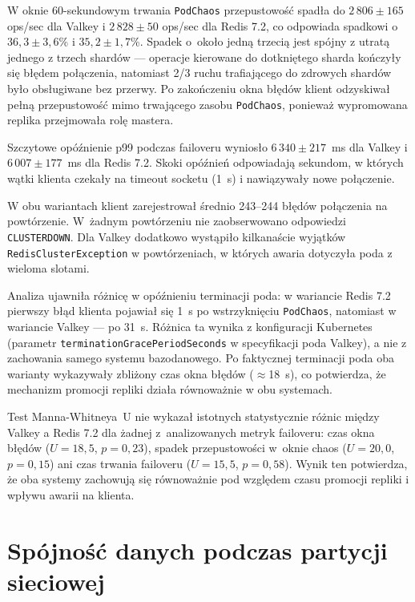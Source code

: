 W oknie 60-sekundowym trwania \texttt{PodChaos} przepustowość spadła do $2\,806 \pm 165$ ops/sec dla Valkey i $2\,828 \pm 50$ ops/sec dla Redis 7.2, co odpowiada spadkowi o $36{,}3 \pm 3{,}6$\% i $35{,}2 \pm 1{,}7$\%. Spadek o~około jedną trzecią jest spójny z utratą jednego z trzech shardów --- operacje kierowane do dotkniętego sharda kończyły się błędem połączenia, natomiast 2/3 ruchu trafiającego do zdrowych shardów było obsługiwane bez przerwy. Po zakończeniu okna błędów klient odzyskiwał pełną przepustowość mimo trwającego zasobu \texttt{PodChaos}, ponieważ wypromowana replika przejmowała rolę mastera.

Szczytowe opóźnienie p99 podczas failoveru wyniosło $6\,340 \pm 217$~ms dla Valkey i $6\,007 \pm 177$~ms dla Redis 7.2. Skoki opóźnień odpowiadają sekundom, w których wątki klienta czekały na timeout socketu (1~s) i nawiązywały nowe połączenie.

W obu wariantach klient zarejestrował średnio 243--244 błędów połączenia na powtórzenie. W~żadnym powtórzeniu nie zaobserwowano odpowiedzi \texttt{CLUSTERDOWN}. Dla Valkey dodatkowo wystąpiło kilkanaście wyjątków \texttt{RedisClusterException} w powtórzeniach, w których awaria dotyczyła poda z wieloma slotami.

Analiza ujawniła różnicę w opóźnieniu terminacji poda: w wariancie Redis 7.2 pierwszy błąd klienta pojawiał się 1~s po wstrzyknięciu \texttt{PodChaos}, natomiast w wariancie Valkey --- po 31~s. Różnica ta wynika z konfiguracji Kubernetes (parametr \texttt{terminationGracePeriodSeconds} w specyfikacji poda Valkey), a nie z zachowania samego systemu bazodanowego. Po faktycznej terminacji poda oba warianty wykazywały zbliżony czas okna błędów ($\approx$18~s), co potwierdza, że mechanizm promocji repliki działa równoważnie w obu systemach.

Test Manna-Whitneya~U nie wykazał istotnych statystycznie różnic między Valkey a Redis 7.2 dla żadnej z~analizowanych metryk failoveru: czas okna błędów ($U = 18{,}5$, $p = 0{,}23$), spadek przepustowości w~oknie chaos ($U = 20{,}0$, $p = 0{,}15$) ani czas trwania failoveru ($U = 15{,}5$, $p = 0{,}58$). Wynik ten potwierdza, że oba systemy zachowują się równoważnie pod względem czasu promocji repliki i wpływu awarii na klienta.

\section{Spójność danych podczas partycji sieciowej}

